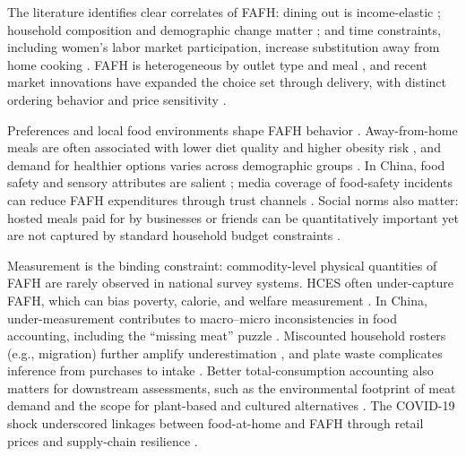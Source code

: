 \documentclass[12pt,a4paper]{article}
\begin{document}
The literature identifies clear correlates of FAFH: dining out is income-elastic \citep{Byrne1996, Liu2015}; household composition and demographic change matter \citep{McCracken1987, Min2015}; and time constraints, including women’s labor market participation, increase substitution away from home cooking \citep{Yen1993}. FAFH is heterogeneous by outlet type and meal \citep{Bai2012, RichardsMancino2014}, and recent market innovations have expanded the choice set through delivery, with distinct ordering behavior and price sensitivity \citep{Kilders2024}.

Preferences and local food environments shape FAFH behavior \citep{Bhuyan2011}. Away-from-home meals are often associated with lower diet quality and higher obesity risk \citep{Zhen2024}, and demand for healthier options varies across demographic groups \citep{Anderson2026, Leschewski2018}. In China, food safety and sensory attributes are salient \citep{ZhengWang2016}; media coverage of food-safety incidents can reduce FAFH expenditures through trust channels \citep{Li2024}. Social norms also matter: hosted meals paid for by businesses or friends can be quantitatively important yet are not captured by standard household budget constraints \citep{Bai2010}.

Measurement is the binding constraint: commodity-level physical quantities of FAFH are rarely observed in national survey systems. HCES often under-capture FAFH, which can bias poverty, calorie, and welfare measurement \citep{Farfan2017, FiedlerYadav2017}. In China, under-measurement contributes to macro--micro inconsistencies in food accounting, including the ``missing meat'' puzzle \citep{Xiao2015, YuAbler2014}. Miscounted household rosters (e.g., migration) further amplify underestimation \citep{YuAbler2016}, and plate waste complicates inference from purchases to intake \citep{Xu2020}. Better total-consumption accounting also matters for downstream assessments, such as the environmental footprint of meat demand and the scope for plant-based and cultured alternatives \citep{Ortega2022}. The COVID-19 shock underscored linkages between food-at-home and FAFH through retail prices and supply-chain resilience \citep{Amin2026, Balagtas2023, Ellison2021}.
\end{document}
